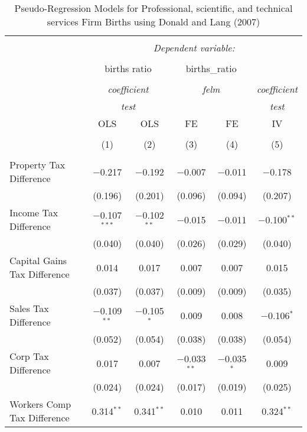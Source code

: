 
\begin{table}[!htbp] \centering 
  \caption{Pseudo-Regression Models for  Professional, scientific, and technical services Firm Births using Donald and Lang (2007)} 
  \label{} 
\begin{tabular}{@{\extracolsep{5pt}}lccccc} 
\\[-1.8ex]\hline 
\hline \\[-1.8ex] 
 & \multicolumn{5}{c}{\textit{Dependent variable:}} \\ 
\cline{2-6} 
\\[-1.8ex] & \multicolumn{2}{c}{births ratio} & \multicolumn{2}{c}{births\_ratio} &   \\ 
\\[-1.8ex] & \multicolumn{2}{c}{\textit{coefficient}} & \multicolumn{2}{c}{\textit{felm}} & \textit{coefficient} \\ 
 & \multicolumn{2}{c}{\textit{test}} & \multicolumn{2}{c}{\textit{}} & \textit{test} \\ 
 & OLS & OLS & FE & FE & IV \\ 
\\[-1.8ex] & (1) & (2) & (3) & (4) & (5)\\ 
\hline \\[-1.8ex] 
 Property Tax Difference & $-$0.217 & $-$0.192 & $-$0.007 & $-$0.011 & $-$0.178 \\ 
  & (0.196) & (0.201) & (0.096) & (0.094) & (0.207) \\ 
  Income Tax Difference & $-$0.107$^{***}$ & $-$0.102$^{**}$ & $-$0.015 & $-$0.011 & $-$0.100$^{**}$ \\ 
  & (0.040) & (0.040) & (0.026) & (0.029) & (0.040) \\ 
  Capital Gains Tax Difference & 0.014 & 0.017 & 0.007 & 0.007 & 0.015 \\ 
  & (0.037) & (0.037) & (0.009) & (0.009) & (0.035) \\ 
  Sales Tax Difference & $-$0.109$^{**}$ & $-$0.105$^{*}$ & 0.009 & 0.008 & $-$0.106$^{*}$ \\ 
  & (0.052) & (0.054) & (0.038) & (0.038) & (0.054) \\ 
  Corp Tax Difference & 0.017 & 0.007 & $-$0.033$^{**}$ & $-$0.035$^{*}$ & 0.009 \\ 
  & (0.024) & (0.024) & (0.017) & (0.019) & (0.025) \\ 
  Workers Comp Tax Difference & 0.314$^{**}$ & 0.341$^{**}$ & 0.010 & 0.011 & 0.324$^{**}$ \\ 

\end{tabular}
\end{table}
